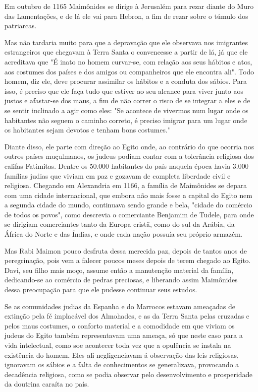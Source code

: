 \begin{itemize}
\begin{enumrate}
Em outubro de 1165 Maimônides se dirige à Jerusalém para rezar dian­te
do Muro das Lamentações, e de lá ele vai para Hebron, a fim de rezar
sobre o túmulo dos patriarcas.

Mas não tardaria muito para que a depravação que ele observava nos
imigrantes estrangeiros que chegavam à Terra Santa o convencesse a
partir de lá, já que ele acreditava que "É inato no homem curvar-se, com
relação aos seus hábitos e atos, aos costumes dos países e dos amigos ou
companheiros que ele encontra ali". Todo homem, diz ele, deve procurar
assimilar os hábitos e a con­duta dos sábios. Para isso, é preciso que
ele faça tudo que estiver ao seu alcan­ce para viver junto aos justos e
afastar-se dos maus, a fim de não correr o risco de se integrar a eles e
de se sentir inclinado a agir como eles: "Se acontece de vivermos num
lugar onde os habitantes não seguem o caminho correto, é pre­ciso
imigrar para um lugar onde os habitantes sejam devotos e tenham bons
costumes."

Diante disso, ele parte com direção ao Egito onde, ao contrário do que
ocorria nos outros países muçulmanos, os judeus podiam contar com a
to­lerância religiosa dos califas Fatimitas. Dentre os 50.000 habitantes
do país na­quela época havia 3.000 famílias judias que viviam em paz e
gozavam de com­pleta liberdade civil e religiosa. Chegando em Alexandria
em 1166, a família de Maimônides se depara com uma cidade internacional,
que embora não mais fosse a capital do Egito nem a segunda cidade do
mundo, continuava sendo grande e bela, "cidade do comércio de todos os
povos", como descrevia o co­merciante Benjamim de Tudele, para onde se
dirigiam comerciantes tanto da Europa cristã, como do sul da Arábia, da
África do Norte e das Índias, e onde cada nação possuía seu próprio
armazém.

Mas Rabi Maimon pouco desfruta dessa merecida paz, depois de tan­tos
anos de peregrinação, pois vem a falecer poucos meses depois de terem
chegado ao Egito. Davi, seu filho mais moço, assume então a manutenção
ma­terial da família, dedicando-se ao comércio de pedras preciosas, e
liberando as­sim Maimônides dessa preocupação para que ele pudesse
continuar seus estudos.

Se as comunidades judias da Espanha e do Marrocos estavam amea­çadas de
extinção pela fé implacável dos Almohades, e as da Terra Santa pelas
cruzadas e pelos maus costumes, o conforto material e a comodidade em
que viviam os judeus do Egito também representavam uma ameaça, só que
neste caso para a vida intelectual, como soe acontecer toda vez que a
opulência se instala na existência do homem. Eles ali negligenciavam á
observação das leis religiosas, ignoravam os sábios e a falta de
conhecimentos se generalizava, pro­vocando a decadência religiosa, como
se podia observar pelo desenvolvimen­to e prosperidade da doutrina
caraíta no país.


\end{enumrate}
\end{itemize}
